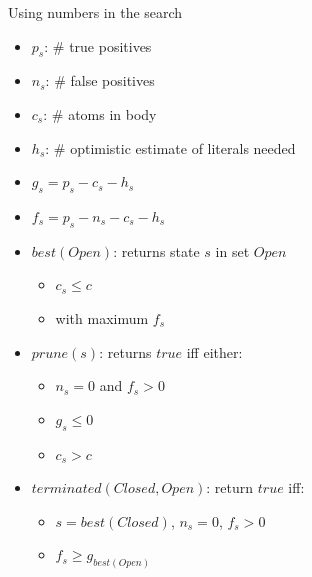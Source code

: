 \begin{frame}{Using numbers in the search}
\begin{multicols}{2}
\begin{itemize}
    \item $p_s$: $\#$ true positives 
    \item $n_s$: $\#$ false positives
    \item $c_s$: $\#$ atoms in body
    \item $h_s$: $\#$ optimistic estimate of literals needed
    \item $g_s = p_s-c_s-h_s$
    \item $f_s=p_s-n_s-c_s-h_s$
\end{itemize}
\end{multicols}    
\begin{itemize}
    \item $best(Open)$: returns state $s$ in set $Open$ 
    \begin{itemize}
        \item $c_s \leq c$
        \item with maximum $f_s$
    \end{itemize}
    \item $prune(s)$: returns $true$ iff either:
    \begin{itemize}
        \item $n_s=0$ and $f_s>0$
        \item $g_s \leq 0$
        \item $c_s > c$
    \end{itemize}
    \item $terminated(Closed, Open)$: return $true$ iff:
    \begin{itemize}
        \item $s = best(Closed)$, $n_s=0$, $f_s > 0$
        \item $f_s \geq g_{best(Open)}$
    \end{itemize}
\end{itemize}
\end{frame}

